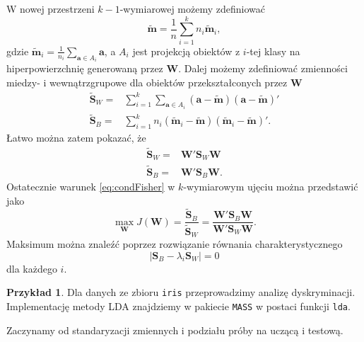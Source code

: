 \documentclass[
]{book}
\theoremstyle{plain}
\theoremstyle{definition}
\theoremstyle{definition}
\theoremstyle{definition}
\newtheorem{example}{Przykład}[chapter]
\theoremstyle{definition}
\theoremstyle{definition}
\theoremstyle{remark}
\begin{document}
W nowej przestrzeni \(k-1\)-wymiarowej możemy zdefiniować
\begin{equation}
    \tilde{\boldsymbol{m}}=\frac{1}{n}\sum_{i=1}^kn_i\tilde{\boldsymbol{m}}_i,
\end{equation}
gdzie \(\tilde{\boldsymbol{m}}_i= \frac{1}{n_i}\sum_{\boldsymbol{a}\in A_i}\boldsymbol{a}\), a \(A_i\) jest projekcją obiektów z \(i\)-tej klasy na hiperpowierzchnię generowaną przez \(\boldsymbol{W}\).
Dalej możemy zdefiniować zmienności miedzy- i wewnątrzgrupowe dla obiektów przekształconych przez \(\boldsymbol{W}\)
\begin{align}
    \tilde{\boldsymbol{S}}_W=&\sum_{i=1}^k\sum_{\boldsymbol{a}\in A_i}(\boldsymbol{a}-\tilde{\boldsymbol{m}})(\boldsymbol{a}-\tilde{\boldsymbol{m}})'\\
    \tilde{\boldsymbol{S}}_B=&\sum_{i=1}^kn_i(\tilde{\boldsymbol{m}}_i-\tilde{\boldsymbol{m}})(\tilde{\boldsymbol{m}}_i-\tilde{\boldsymbol{m}})'.
\end{align}
Łatwo można zatem pokazać, że
\begin{align}
    \tilde{\boldsymbol{S}}_W = & \boldsymbol{W}'\boldsymbol{S}_W\boldsymbol{W}\\
    \tilde{\boldsymbol{S}}_B = & \boldsymbol{W}'\boldsymbol{S}_B\boldsymbol{W}.
\end{align}
Ostatecznie warunek \eqref{eq:condFisher} w \(k\)-wymiarowym ujęciu można przedstawić jako
\begin{equation}
    \max_{\boldsymbol{W}}J(\boldsymbol{W})=\frac{\tilde{\boldsymbol{S}}_B}{\tilde{\boldsymbol{S}}_W}=\frac{\boldsymbol{W}'\boldsymbol{S}_B\boldsymbol{W}}{\boldsymbol{W}'\boldsymbol{S}_W\boldsymbol{W}}.
\end{equation}
Maksimum można znaleźć poprzez rozwiązanie równania charakterystycznego \begin{equation}
    |\boldsymbol{S}_B-\lambda_i\boldsymbol{S}_W|=0
\end{equation}
dla każdego \(i\).

\begin{example}
\protect\hypertarget{exm:unnamed-chunk-51}{}\label{exm:unnamed-chunk-51}Dla danych ze zbioru \texttt{iris} przeprowadzimy analizę dyskryminacji. Implementację metody LDA znajdziemy w pakiecie \texttt{MASS} w postaci funkcji \texttt{lda}.
\end{example}

Zaczynamy od standaryzacji zmiennych i podziału próby na uczącą i testową.
\end{document}
